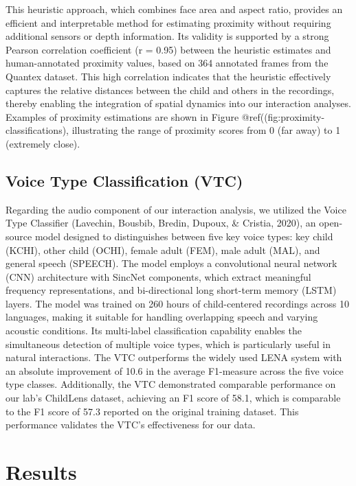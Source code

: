 \documentclass[
  man,floatsintext]{apa6}
\begin{document}
This heuristic approach, which combines face area and aspect ratio, provides an efficient and interpretable method for estimating proximity without requiring additional sensors or depth information. Its validity is supported by a strong Pearson correlation coefficient (r = 0.95) between the heuristic estimates and human-annotated proximity values, based on 364 annotated frames from the Quantex dataset. This high correlation indicates that the heuristic effectively captures the relative distances between the child and others in the recordings, thereby enabling the integration of spatial dynamics into our interaction analyses. Examples of proximity estimations are shown in Figure @ref((fig:proximity-classifications), illustrating the range of proximity scores from 0 (far away) to 1 (extremely close).

\subsection{Voice Type Classification (VTC)}\label{voice-type}

Regarding the audio component of our interaction analysis, we utilized the Voice Type Classifier (Lavechin, Bousbib, Bredin, Dupoux, \& Cristia, 2020), an open-source model designed to distinguishes between five key voice types: key child (KCHI), other child (OCHI), female adult (FEM), male adult (MAL), and general speech (SPEECH). The model employs a convolutional neural network (CNN) architecture with SincNet components, which extract meaningful frequency representations, and bi-directional long short-term memory (LSTM) layers. The model was trained on 260 hours of child-centered recordings across 10 languages, making it suitable for handling overlapping speech and varying acoustic conditions. Its multi-label classification capability enables the simultaneous detection of multiple voice types, which is particularly useful in natural interactions. The VTC outperforms the widely used LENA system with an absolute improvement of 10.6 in the average F1-measure across the five voice type classes. Additionally, the VTC demonstrated comparable performance on our lab's ChildLens dataset, achieving an F1 score of 58.1, which is comparable to the F1 score of 57.3 reported on the original training dataset. This performance validates the VTC's effectiveness for our data.

\section{Results}\label{results}
\end{document}
